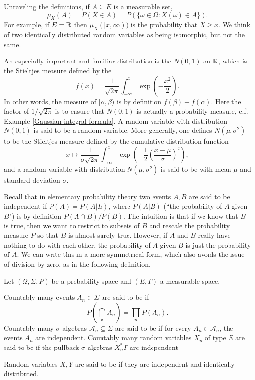 \begin{subsec}
Unraveling the definitions, if $A \subseteq E$ is a measurable set,
$$\mu_X(A) = P(X \in A) = P(\{\omega \in \Omega: X(\omega) \in A\}).$$
For example, if $E = \mathbb{R}$ then $\mu_X([x, \infty))$ is the probability that $X \geq x$.
We think of two identically distributed random variables as being isomorphic, but not the same.
\end{subsec}

\begin{example}
An especially important and familiar distribution is the  $N(0, 1)$ on $\mathbb{R}$, which is the Stieltjes measure defined by the 
$$f(x) = \frac{1}{\sqrt{2\pi}} \int_{-\infty}^x \exp\left(-\frac{x^2}{2}\right).$$
In other words, the measure of $[\alpha, \beta)$ is by definition $f(\beta) - f(\alpha)$.
Here the factor of $1/\sqrt{2\pi}$ is to ensure that $N(0, 1)$ is actually a probability measure, c.f. Example \ref{Gaussian integral formula}.
A random variable with distribution $N(0, 1)$ is said to be a  random variable. More generally, one defines $N(\mu, \sigma^2)$ to be the Stieltjes measure defined by the cumulative distribution function
$$x \mapsto \frac{1}{\sigma\sqrt{2\pi}} \int_{-\infty}^x \exp\left(-\frac{1}{2}\left(\frac{x - \mu}{\sigma}\right)^2\right),$$
and a random variable with distribution $N(\mu, \sigma^2)$ is said to be  with mean $\mu$ and standard deviation $\sigma$.
\end{example}

\begin{subsec}
Recall that in elementary probability theory two events $A,B$ are said to be independent if $P(A) = P(A|B)$, where $P(A|B)$ (``the probability of $A$ given $B$") is by definition $P(A \cap B)/P(B)$.
The intuition is that if we know that $B$ is true, then we want to restrict to subsets of $B$ and rescale the probability measure $P$ so that $B$ is almost surely true.
However, if $A$ and $B$ really have nothing to do with each other, the probability of $A$ given $B$ is just the probability of $A$.
We can write this in a more symmetrical form, which also avoids the issue of division by zero, as in the following definition.
\end{subsec}

\begin{definition}
Let $(\Omega, \Sigma, P)$ be a probability space and $(E, \Gamma)$ a measurable space.

Countably many events $A_n \in \Sigma$ are said to be  if
$$P\left(\bigcap_n A_n\right) = \prod_n P(A_n).$$
Countably many $\sigma$-algebras $\mathcal A_n \subseteq \Sigma$ are said to be  if for every $A_n \in \mathcal A_n$, the events $A_n$ are independent.
Countably many random variables $X_n$ of type $E$ are said to be  if the pullback $\sigma$-algebras $X_n^*\Gamma$ are independent.

Random variables $X,Y$ are said to be  if they are independent and identically distributed.
\end{definition}

